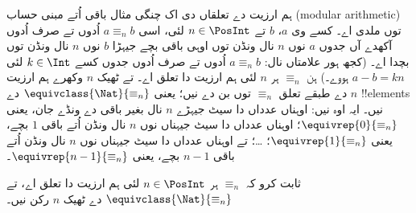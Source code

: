 \documentclass[../../../include/open-logic-section]{subfiles}
\begin{document}
\begin{ex}
ہم ارزیت دے تعلقاں دی اک چنگی مثال باقی اُتے مبنی حساب (modular arithmetic)
توں ملدی اے۔
کسے وی $a$، $b$ تے $n \in \PosInt$ لئی، اسی $a \equiv_n b$ اُدوں تے
صرف اُدوں آکھدے آں جدوں $a$ نوں $n$ نال ونڈن توں اوہی باقی بچے جیہڑا
$b$ نوں $n$ نال ونڈن توں بچدا اے۔ (کجھ ہور علامتاں نال: $a \equiv_n b$
اُدوں تے صرف اُدوں جدوں کسے $k \in \Int$ لئی $a - b = kn$ ہووے۔) ہن
$\equiv_n$ ہر $n$ لئی ہم ارزیت دا تعلق اے۔ تے ٹھیک $n$ وکھرے ہم ارزیت دے
طبقے تعلق $\equiv_n$ توں بن دے نیں؛ یعنی $\equivclass{\Nat}{\equiv_n}$ دے
$n$ !!{element}s نیں۔ ایہ اوہ نیں: اوہناں عدداں دا سیٹ جیہڑے $n$ نال
بغیر باقی دے ونڈے جان، یعنی $\equivrep{0}{\equiv_n}$؛ اوہناں عدداں دا سیٹ
جیہناں نوں $n$ نال ونڈن اُتے باقی $1$ بچے، یعنی $\equivrep{1}{\equiv_n}$؛
\ldots؛ تے اوہناں عدداں دا سیٹ جیہناں نوں $n$ نال ونڈن اُتے باقی $n-1$
بچے، یعنی $\equivrep{n-1}{\equiv_n}$۔
\end{ex}

\begin{prob}
ثابت کرو کہ $\equiv_n$ ہر $n \in \PosInt$ لئی ہم ارزیت دا تعلق اے، تے
$\equivclass{\Nat}{\equiv_n}$ دے ٹھیک $n$ رکن نیں۔
\end{prob}
\end{document}
